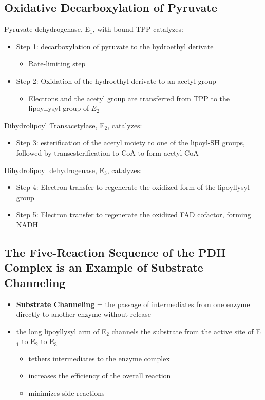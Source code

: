 \documentclass[10pt]{article}
\begin{document}
\subsection*{Oxidative Decarboxylation of Pyruvate}
Pyruvate dehydrogenase, E$_1$, with bound TPP catalyzes:
\begin{itemize}
	\item Step 1: decarboxylation of pyruvate to the hydroethyl derivate
	\begin{itemize}
        \item Rate-limiting step
    \end{itemize}
	\item Step 2: Oxidation of the hydroethyl derivate to an acetyl group
	\begin{itemize}
        \item Electrons and the acetyl group are transferred from TPP to the lipoyllysyl group of $E_2$
    \end{itemize}
\end{itemize}
Dihydrolipoyl Transacetylase, E$_2$, catalyzes:
\begin{itemize}
	\item Step 3: esterification of the acetyl moiety to one of the lipoyl-SH groups, followed by transesterification to CoA to form acetyl-CoA
\end{itemize}
Dihydrolipoyl dehydrogenase, E$_3$, catalyzes:
\begin{itemize}
	\item Step 4: Electron transfer to regenerate the oxidized form of the lipoyllysyl group
	\item Step 5: Electron transfer to regenerate the oxidized FAD cofactor, forming NADH
\end{itemize}

\subsection*{The Five-Reaction Sequence of the PDH Complex is an Example of Substrate Channeling}
\begin{itemize}
	\item \textbf{Substrate Channeling} = the passage of intermediates from one enzyme directly to another enzyme without release
	\item the long lipoyllysyl arm of E$_2$ channels the substrate from the active site of E$_1$ to E$_2$ to E$_3$
	\begin{itemize}
        \item tethers intermediates to the enzyme complex
        \item increases the efficiency of the overall reaction
        \item minimizes side reactions
    \end{itemize}
\end{itemize}
\end{document}
